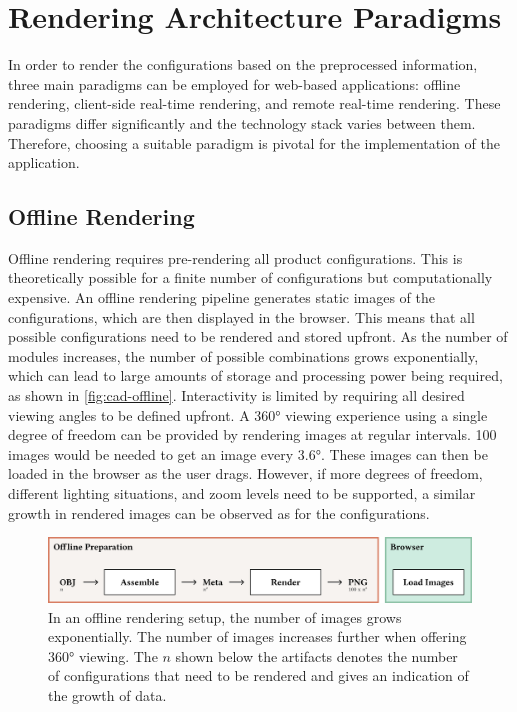 \section{Rendering Architecture Paradigms}

In order to render the configurations based on the preprocessed information, three main paradigms can be employed for web-based applications: offline rendering, client-side real-time rendering, and remote real-time rendering. These paradigms differ significantly and the technology stack varies between them. Therefore, choosing a suitable paradigm is pivotal for the implementation of the application.

\subsection*{Offline Rendering}

Offline rendering requires pre-rendering all product configurations. This is theoretically possible for a finite number of configurations but computationally expensive. An offline rendering pipeline generates static images of the configurations, which are then displayed in the browser. This means that all possible configurations need to be rendered and stored upfront. As the number of modules increases, the number of possible combinations grows exponentially, which can lead to large amounts of storage and processing power being required, as shown in \autoref{fig:cad-offline}. Interactivity is limited by requiring all desired viewing angles to be defined upfront. A 360° viewing experience using a single degree of freedom can be provided by rendering images at regular intervals. 100 images would be needed to get an image every 3.6°. These images can then be loaded in the browser as the user drags. However, if more degrees of freedom, different lighting situations, and zoom levels need to be supported, a similar growth in rendered images can be observed as for the configurations.

\begin{figure}[H]
  \includegraphics[width=\columnwidth]{resources/cad-pipeline-offline.png}
  \caption{In an offline rendering setup, the number of images grows exponentially. The number of images increases further when offering 360° viewing. The $n$ shown below the artifacts denotes the number of configurations that need to be rendered and gives an indication of the growth of data.}
  \label{fig:cad-offline}
\end{figure}

